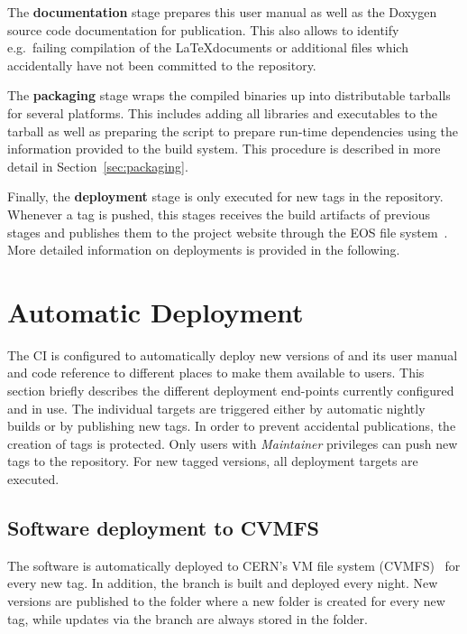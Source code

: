 The \textbf{documentation} stage prepares this user manual as well as the Doxygen source code documentation for publication.
This also allows to identify e.g.\ failing compilation of the \LaTeX documents or additional files which accidentally have not been committed to the repository.

The \textbf{packaging} stage wraps the compiled binaries up into distributable tarballs for several platforms.
This includes adding all libraries and executables to the tarball as well as preparing the  script to prepare run-time dependencies using the information provided to the build system.
This procedure is described in more detail in Section~\ref{sec:packaging}.

Finally, the \textbf{deployment} stage is only executed for new tags in the repository.
Whenever a tag is pushed, this stages receives the build artifacts of previous stages and publishes them to the \apsq project website through the EOS file system~\cite{eos}. More detailed information on deployments is provided in the following.

\section{Automatic Deployment}

The CI is configured to automatically deploy new versions of \apsq and its user manual and code reference to different places to make them available to users.
This section briefly describes the different deployment end-points currently configured and in use.
The individual targets are triggered either by automatic nightly builds or by publishing new tags.
In order to prevent accidental publications, the creation of tags is protected.
Only users with \emph{Maintainer} privileges can push new tags to the repository.
For new tagged versions, all deployment targets are executed.

\subsection{Software deployment to CVMFS}
\label{sec:cvmfs}

The software is automatically deployed to CERN's VM file system (CVMFS)~\cite{cvmfs} for every new tag.
In addition, the  branch is built and deployed every night.
New versions are published to the folder  where a new folder is created for every new tag, while updates via the  branch are always stored in the  folder.

